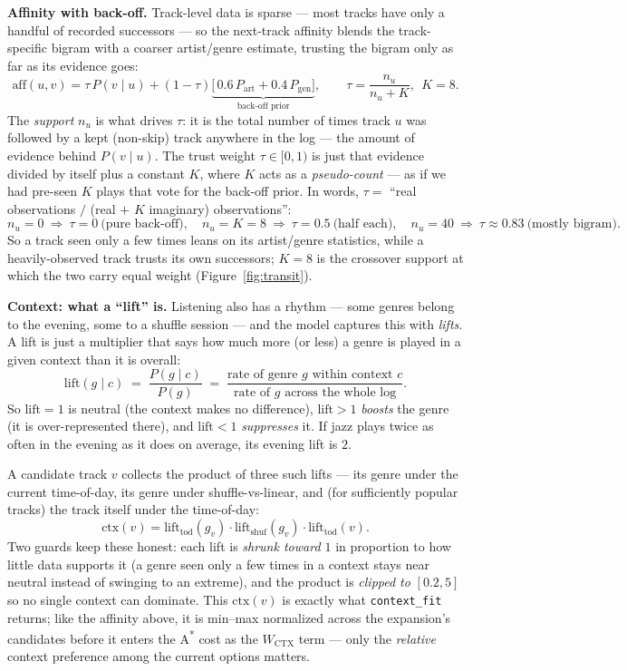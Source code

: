 \documentclass[11pt]{article}
\newcommand{\code}[1]{\texttt{\small #1}}
\begin{document}
\textbf{Affinity with back-off.} Track-level data is sparse --- most tracks have only a handful of
recorded successors --- so the next-track affinity blends the track-specific bigram with a coarser
artist/genre estimate, trusting the bigram only as far as its evidence goes:
\[
\text{aff}(u,v) = \tau\,P(v\mid u) + (1-\tau)\underbrace{\big[\,0.6\,P_{\text{art}} + 0.4\,P_{\text{gen}}\big]}_{\text{back-off prior}},
\qquad \tau = \frac{n_u}{n_u + K},\ \ K=8 .
\]
The \emph{support} $n_u$ is what drives $\tau$: it is the total number of times track $u$ was
followed by a kept (non-skip) track anywhere in the log --- the amount of evidence behind
$P(v\mid u)$. The trust weight $\tau\in[0,1)$ is just that evidence divided by itself plus a constant
$K$, where $K$ acts as a \emph{pseudo-count} --- as if we had pre-seen $K$ plays that vote for the
back-off prior. In words, $\tau = $ ``real observations $/$ (real $+$ $K$ imaginary) observations'':
\[
n_u=0\ \Rightarrow\ \tau=0\ \text{(pure back-off)},\quad
n_u=K=8\ \Rightarrow\ \tau=0.5\ \text{(half each)},\quad
n_u=40\ \Rightarrow\ \tau\approx0.83\ \text{(mostly bigram)}.
\]
So a track seen only a few times leans on its artist/genre statistics, while a heavily-observed
track trusts its own successors; $K=8$ is the crossover support at which the two carry equal weight
(Figure~\ref{fig:transit}).

\textbf{Context: what a ``lift'' is.} Listening also has a rhythm --- some genres belong to the
evening, some to a shuffle session --- and the model captures this with \emph{lifts}. A lift is just
a multiplier that says how much more (or less) a genre is played in a given context than it is
overall:
\[
\text{lift}(g\mid c)\;=\;\frac{P(g\mid c)}{P(g)}
\;=\;\frac{\text{rate of genre } g \text{ within context } c}{\text{rate of } g \text{ across the whole log}} .
\]
So $\text{lift}=1$ is neutral (the context makes no difference), $\text{lift}>1$ \emph{boosts} the
genre (it is over-represented there), and $\text{lift}<1$ \emph{suppresses} it. If jazz plays twice
as often in the evening as it does on average, its evening lift is $2$.

A candidate track $v$ collects the product of three such lifts --- its genre under the current
time-of-day, its genre under shuffle-vs-linear, and (for sufficiently popular tracks) the track
itself under the time-of-day:
\[
\text{ctx}(v)=\text{lift}_{\text{tod}}(g_v)\cdot\text{lift}_{\text{shuf}}(g_v)\cdot\text{lift}_{\text{tod}}(v).
\]
Two guards keep these honest: each lift is \emph{shrunk toward $1$} in proportion to how little data
supports it (a genre seen only a few times in a context stays near neutral instead of swinging to an
extreme), and the product is \emph{clipped to} $[0.2,5]$ so no single context can dominate. This
$\text{ctx}(v)$ is exactly what \code{context\_fit} returns; like the affinity above, it is min--max
normalized across the expansion's candidates before it enters the A\textsuperscript{*} cost as the
$W_{\text{CTX}}$ term --- only the \emph{relative} context preference among the current options
matters.
\end{document}
